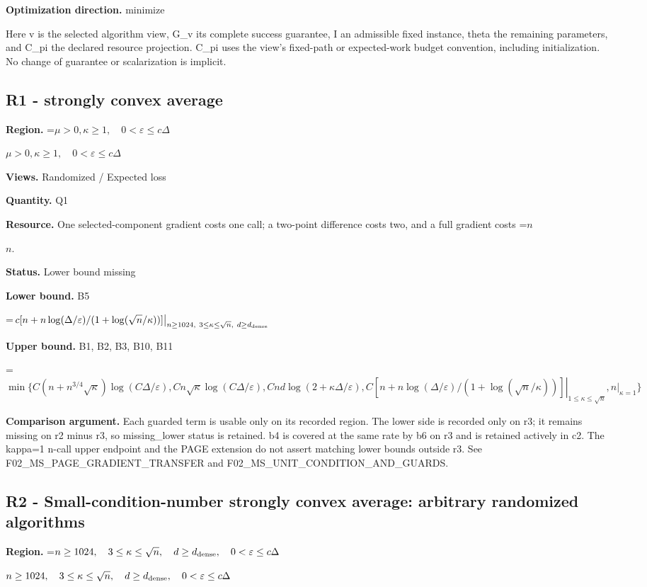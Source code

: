 \documentclass[10pt,a4paper]{article}
\newcommand{\AtlasMath}[1]{\par\begingroup\centering\setbox0=\hbox{$\displaystyle #1$}\ifdim\wd0>1.4\linewidth\typeout{ATLAS WIDE FORMULA: \the\wd0}\fi\ifdim\wd0>\linewidth\resizebox{\linewidth}{!}{\box0}\else\box0\fi\par\endgroup}
\newcommand{\AtlasInlineMath}[1]{\begingroup\setbox0=\hbox{$#1$}\ifdim\wd0>.4\linewidth\endgroup\AtlasMath{#1}\else\endgroup$#1$\fi}
\begin{document}
\textbf{Optimization direction.} minimize

Here v is the selected algorithm view, G\_\allowbreak{}v its complete success guarantee, I an admissible fixed instance, theta the remaining parameters, and C\_\allowbreak{}pi the declared resource projection. C\_\allowbreak{}pi uses the view's fixed-path or expected-work budget convention, including initialization. No change of guarantee or scalarization is implicit.

\subsection{R1 - strongly convex average}
\textbf{Region.} \AtlasInlineMath{\mu>0,\kappa\ge1,\quad0<\varepsilon\le c\Delta}

\textbf{Views.} Randomized / Expected loss

\textbf{Quantity.} Q1

\textbf{Resource.} One selected-component gradient costs one call; a two-point difference costs two, and a full gradient costs \AtlasInlineMath{n}.

\textbf{Status.} Lower bound missing

\textbf{Lower bound.} B5

\AtlasMath{\left.c[n+n\log(\Delta/\varepsilon)/(1+\log(\sqrt n/\kappa))]\right|_{n\ge1024,\ 3\le\kappa\le\sqrt n,\ d\ge d_{\rm dense}}}
\textbf{Upper bound.} B1, B2, B3, B10, B11

\AtlasMath{\min\{C(n+n^{3/4}\sqrt\kappa)\log(C\Delta/\varepsilon),Cn\sqrt\kappa\log(C\Delta/\varepsilon),Cnd\log(2+\kappa\Delta/\varepsilon),\left.C[n+n\log(\Delta/\varepsilon)/(1+\log(\sqrt n/\kappa))]\right|_{1\le\kappa\le\sqrt n},\left.n\right|_{\kappa=1}\}}
\textbf{Comparison argument.} Each guarded term is usable only on its recorded region. The lower side is recorded only on r3; it remains missing on r2 minus r3, so missing\_\allowbreak{}lower status is retained. b4 is covered at the same rate by b6 on r3 and is retained actively in c2. The kappa=1 n-call upper endpoint and the PAGE extension do not assert matching lower bounds outside r3. See F02\_\allowbreak{}MS\_\allowbreak{}PAGE\_\allowbreak{}GRADIENT\_\allowbreak{}TRANSFER and F02\_\allowbreak{}MS\_\allowbreak{}UNIT\_\allowbreak{}CONDITION\_\allowbreak{}AND\_\allowbreak{}GUARDS.

\subsection{R2 - Small-condition-number strongly convex average: arbitrary randomized algorithms}
\textbf{Region.} \AtlasInlineMath{n\ge1024,\quad3\le\kappa\le\sqrt n,\quad d\ge d_{\rm dense},\quad0<\varepsilon\le c\Delta}
\end{document}
